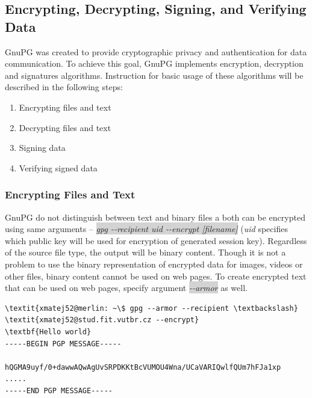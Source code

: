 \subsection{Encrypting, Decrypting, Signing, and Verifying Data}
GnuPG was created to provide cryptographic privacy and authentication for data communication. To achieve this goal, GnuPG implements encryption, decryption and signatures algorithms. Instruction for basic usage of these algorithms will be described in the following steps:
\begin{enumerate}
    \item Encrypting files and text
    \item Decrypting files and text
    \item Signing data
    \item Verifying signed data
\end{enumerate}

\subsubsection*{Encrypting Files and Text}
GnuPG do not distinguish between text and binary files a both can be encrypted using same arguments -- \colorbox{lightgray}{\textit{gpg -{}-recipient uid -{}-encrypt [filename]}} (\textit{uid} specifies which public key will be used for encryption of generated session key). Regardless of the source file type, the output will be binary content. Though it is not a problem to use the binary representation of encrypted data for images, videos or other files, binary content cannot be used on web pages. To create encrypted text that can be used on web pages, specify argument \colorbox{lightgray}{\textit{-{}-armor}} as well.
\begin{Verbatim}[commandchars=\\\{\},codes={\catcode`$=3\catcode`_=8},samepage=true,frame=single]
\textit{xmatej52@merlin: ~\$ gpg --armor --recipient \textbackslash}
\textit{xmatej52@stud.fit.vutbr.cz --encrypt}
\textbf{Hello world}
-----BEGIN PGP MESSAGE-----

hQGMA9uyf/0+dawwAQwAgUvSRPDKKtBcVUMOU4Wna/UCaVARIQwlfQUm7hFJa1xp
.....
-----END PGP MESSAGE-----
\end{Verbatim}
